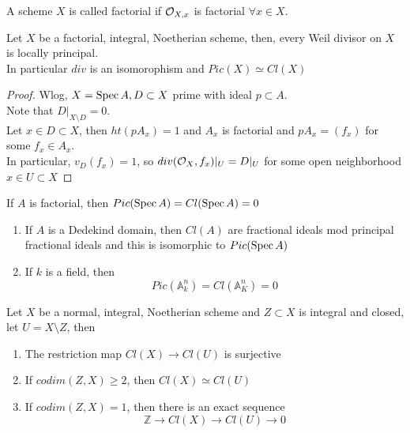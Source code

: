 \documentclass[../main.tex]{subfiles}
\begin{document}
\begin{defn}
	A scheme $X$ is called factorial if $\mathcal{O}_{X,x} $ is factorial $\forall x \in X$.
\end{defn}
\begin{propo}
Let $X$ be a factorial, integral, Noetherian scheme, then, every Weil divisor on $X$ is locally principal.\\
In particular $div$ is an isomorophism and $Pic( X) \simeq Cl( X) $
\end{propo}
\begin{proof}
	Wlog, $X= \operatorname{Spec} A, D \subset X$ prime with ideal $p \subset A$.\\
	Note that $D|_{X\setminus D} = 0$.\\
	Let $x\in D \subset X$, then $ht( p A_x) =1$ and $A_x$ is factorial and $p A_x= ( f_x) $ for some $f_x \in A_x$.\\
	In particular, $v_D( f_x) = 1$, so $ div( \mathcal{O}_X, f_x) |_U = D|_U$ for some open neighborhood $x\in U \subset X$ 
\end{proof}
\begin{crly}
If $A$ is factorial, then $Pic( \operatorname{Spec} A) = Cl ( \operatorname{Spec} A) =0$ 
\end{crly}
\begin{exemple}
\begin{enumerate}
\item If $A$ is a Dedekind domain, then $Cl( A) $ are fractional ideals mod principal fractional ideals and this is isomorphic to $Pic( \operatorname{Spec} A) $ 
\item If $k$ is a field, then
	\[ 
	Pic( \mathbb{A}^{n}_k ) = Cl( \mathbb{A}^{n}_K) =0
	\]
\end{enumerate}
\end{exemple}
\begin{propo}
Let $X$ be a normal, integral, Noetherian scheme and $Z \subset X$ is integral and closed, let $U = X \setminus Z$, then
\begin{enumerate}
\item The restriction map $Cl( X) \to Cl( U) $ is surjective
\item If $codim( Z,X) \geq 2$, then $Cl( X) \simeq Cl( U) $ 
\item If $codim( Z,X) =1$, then there is an exact sequence
	\[ 
	\mathbb{Z}\to Cl( X) \to Cl( U) \to 0
	\]
	
\end{enumerate}

\end{propo}




	
\end{document}

